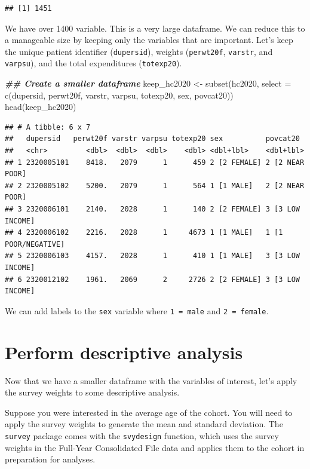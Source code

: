 \documentclass[
]{book}
\newenvironment{Shaded}{\begin{snugshade}}{\end{snugshade}}
\newcommand{\AttributeTok}[1]{\textcolor[rgb]{0.77,0.63,0.00}{#1}}
\newcommand{\DocumentationTok}[1]{\textcolor[rgb]{0.56,0.35,0.01}{\textbf{\textit{#1}}}}
\newcommand{\FunctionTok}[1]{\textcolor[rgb]{0.00,0.00,0.00}{#1}}
\newcommand{\NormalTok}[1]{#1}
\newcommand{\OtherTok}[1]{\textcolor[rgb]{0.56,0.35,0.01}{#1}}
\begin{document}
\begin{verbatim}
## [1] 1451
\end{verbatim}

We have over 1400 variable. This is a very large dataframe. We can reduce this to a manageable size by keeping only the variables that are important. Let's keep the unique patient identifier (\texttt{dupersid}), weights (\texttt{perwt20f}, \texttt{varstr}, and \texttt{varpsu}), and the total expenditures (\texttt{totexp20}).

\begin{Shaded}
\begin{Highlighting}[]
\DocumentationTok{\#\# Create a smaller dataframe}
\NormalTok{keep\_hc2020 }\OtherTok{\textless{}{-}} \FunctionTok{subset}\NormalTok{(hc2020, }\AttributeTok{select =} \FunctionTok{c}\NormalTok{(dupersid, perwt20f, varstr, varpsu, totexp20, sex, povcat20))}
\FunctionTok{head}\NormalTok{(keep\_hc2020)}
\end{Highlighting}
\end{Shaded}

\begin{verbatim}
## # A tibble: 6 x 7
##   dupersid   perwt20f varstr varpsu totexp20 sex          povcat20           
##   <chr>         <dbl>  <dbl>  <dbl>    <dbl> <dbl+lbl>    <dbl+lbl>          
## 1 2320005101    8418.   2079      1      459 2 [2 FEMALE] 2 [2 NEAR POOR]    
## 2 2320005102    5200.   2079      1      564 1 [1 MALE]   2 [2 NEAR POOR]    
## 3 2320006101    2140.   2028      1      140 2 [2 FEMALE] 3 [3 LOW INCOME]   
## 4 2320006102    2216.   2028      1     4673 1 [1 MALE]   1 [1 POOR/NEGATIVE]
## 5 2320006103    4157.   2028      1      410 1 [1 MALE]   3 [3 LOW INCOME]   
## 6 2320012102    1961.   2069      2     2726 2 [2 FEMALE] 3 [3 LOW INCOME]
\end{verbatim}

We can add labels to the \texttt{sex} variable where \texttt{1\ =\ male} and \texttt{2\ =\ female}.

\hypertarget{perform-descriptive-analysis}{%
\section{Perform descriptive analysis}\label{perform-descriptive-analysis}}

Now that we have a smaller dataframe with the variables of interest, let's apply the survey weights to some descriptive analysis.

Suppose you were interested in the average age of the cohort. You will need to apply the survey weights to generate the mean and standard deviation. The \texttt{survey} package comes with the \texttt{svydesign} function, which uses the survey weights in the Full-Year Consolidated File data and applies them to the cohort in preparation for analyses.
\end{document}
